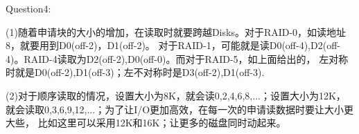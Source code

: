 \documentclass[12pt]{article}
\begin{document}
Question4:\par
(1)随着申请块的大小的增加，在读取时就要跨越Disks。对于RAID-0，如读地址8，就要用到D0(off-2)，D1(off-2)。
对于RAID-1，可能就是读D0(off-4),D2(off-4)。RAID-4读取为D2(off-2),D0(off-0)。而对于RAID-5，如上面给出的，
左对称时就是D0(off-2),D1(off-3)；左不对称时是D3(off-2),D1(off-3).
\begin{figure}[!h]
    \centering
    \hfill
    \hfill
\end{figure}\par
\newpage
(2)对于顺序读取的情况，设置大小为8K，就会读0,2,4,6,8,...；设置大小为12K，就会读取0,3,6,9,12,...；为了让I/O更加高效，在每一次的申请读数据时要让大小更大些，
比如这里可以采用12K和16K；让更多的磁盘同时动起来。
\end{document}
